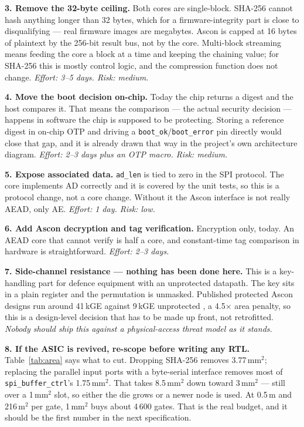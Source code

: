 \documentclass[11pt,a4paper]{article}
\begin{document}
\textbf{3. Remove the 32-byte ceiling.} Both cores are single-block. SHA-256
cannot hash anything longer than 32 bytes, which for a firmware-integrity part
is close to disqualifying --- real firmware images are megabytes. Ascon is
capped at 16 bytes of plaintext by the 256-bit result bus, not by the core.
Multi-block streaming means feeding the core a block at a time and keeping the
chaining value; for SHA-256 this is mostly control logic, and the compression
function does not change. \emph{Effort: 3--5 days. Risk: medium.}

\textbf{4. Move the boot decision on-chip.} Today the chip returns a digest and
the host compares it. That means the comparison --- the actual security
decision --- happens in software the chip is supposed to be protecting.
Storing a reference digest in on-chip OTP and driving a
\texttt{boot\_ok}/\texttt{boot\_error} pin directly would close that gap, and
it is already drawn that way in the project's own architecture diagram.
\emph{Effort: 2--3 days plus an OTP macro. Risk: medium.}

\textbf{5. Expose associated data.} \texttt{ad\_len} is tied to zero in the SPI
protocol. The core implements AD correctly and it is covered by the unit tests,
so this is a protocol change, not a core change. Without it the Ascon interface
is not really AEAD, only AE. \emph{Effort: 1 day. Risk: low.}

\textbf{6. Add Ascon decryption and tag verification.} Encryption only, today.
An AEAD core that cannot verify is half a core, and constant-time tag
comparison in hardware is straightforward. \emph{Effort: 2--3 days.}

\textbf{7. Side-channel resistance --- nothing has been done here.} This is a
key-handling part for defence equipment with an unprotected datapath. The key
sits in a plain register and the permutation is unmasked. Published protected
Ascon designs run around 41\,kGE against 9\,kGE unprotected \cite{survey}, a
4.5$\times$ area penalty, so this is a design-level decision that has to be
made up front, not retrofitted. \emph{Nobody should ship this against a
physical-access threat model as it stands.}

\textbf{8. If the ASIC is revived, re-scope before writing any RTL.}
Table~\ref{tab:area} says what to cut. Dropping SHA-256 removes 3.77\,mm$^2$;
replacing the parallel input ports with a byte-serial interface removes most of
\texttt{spi\_buffer\_ctrl}'s 1.75\,mm$^2$. That takes 8.5\,mm$^2$ down toward
3\,mm$^2$ --- still over a 1\,mm$^2$ slot, so either the die grows or a newer
node is used. At 0.5\,\textmu m and 216\,\textmu m$^2$ per gate, 1\,mm$^2$ buys
about 4\,600 gates. That is the real budget, and it should be the first number
in the next specification.
\end{document}
